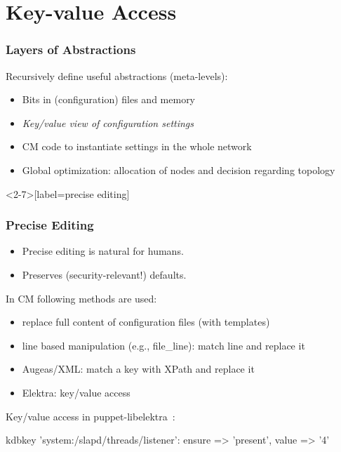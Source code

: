\section{Key-value Access}

\begin{frame}
	\frametitle{Layers of Abstractions}

	Recursively define useful abstractions (meta-levels):

	\begin{itemize}[<+-| alert@+>]
	\item Bits in (configuration) files and memory
	\item \emph{Key/value view of configuration settings}
	\vspace{1em}
	\item CM code to instantiate settings in the whole network
	\item Global optimization: allocation of nodes and decision regarding topology
	\end{itemize}
\end{frame}

\begin{frame}<2-7>[label=precise editing]
	\frametitle{Precise Editing}

	\pause

	\begin{itemize}[<+-| alert@+>]
	\item Precise editing is natural for humans.
	\item Preserves (security-relevant!) defaults.
	\end{itemize}

	\vspace{1cm}
	\pause[\thebeamerpauses]
	In CM following methods are used:

	\begin{itemize}[<+-| alert@+>]
	\item replace full content of configuration files (with templates)
	\item line based manipulation (e.g., file\_line): match line and replace it
	\item Augeas/XML: match a key with XPath and replace it
	\item Elektra: key/value access
	\end{itemize}
\end{frame}

\begin{frame}[fragile]
	Key/value access in puppet-libelektra~\cite{raab2020unified}:
	\vspace{1cm}

	\begin{code}[morekeywords={kdbkey,kdbmount,ensure,value},gobble=4]
	kdbkey {'system:/slapd/threads/listener':
		ensure => 'present',
		value => '4'
	}
	\end{code}
\end{frame}

